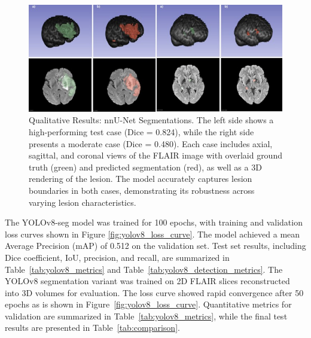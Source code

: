 \documentclass[12pt]{article}
\begin{document}
\begin{figure}[tp]    
    \centering
    \includegraphics[width=\textwidth]{figures/Figure 4.jpg}
    \caption{Qualitative Results: nnU-Net Segmentations. The left side shows a high-performing test case (Dice = 0.824), while the right side presents a moderate case (Dice = 0.480). Each case includes axial, sagittal, and coronal views of the FLAIR image with overlaid ground truth (green) and predicted segmentation (red), as well as a 3D rendering of the lesion. The model accurately captures lesion boundaries in both cases, demonstrating its robustness across varying lesion characteristics.}
    \label{fig:nnunet_qualitative}
\end{figure}


The YOLOv8-seg model was trained for 100 epochs, with training and validation loss curves shown in Figure \ref{fig:yolov8_loss_curve}. The model achieved a mean Average Precision (mAP) of 0.512 on the validation set. Test set results, including Dice coefficient, IoU, precision, and recall, are summarized in Table~\ref{tab:yolov8_metrics} and Table~\ref{tab:yolov8_detection_metrics}. The YOLOv8 segmentation variant was trained on 2D FLAIR slices reconstructed into 3D volumes for evaluation. The loss curve showed rapid convergence after 50 epochs as is shown in Figure~\ref{fig:yolov8_loss_curve}. Quantitative metrics for validation are summarized in Table~\ref{tab:yolov8_metrics}, while the final test results are presented in Table~\ref{tab:comparison}.
\end{document}
